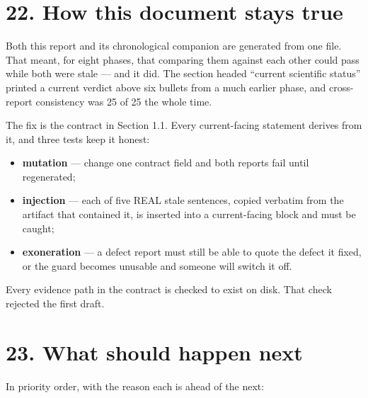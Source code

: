 \documentclass[10pt,]{article}
\providecommand{\tightlist}{%
  \setlength{\itemsep}{0pt}\setlength{\parskip}{0pt}}
\begin{document}
\newpage

\hypertarget{how-this-document-stays-true}{%
\section{22. How this document stays
true}\label{how-this-document-stays-true}}

Both this report and its chronological companion are generated from one
file. That meant, for eight phases, that comparing them against each
other could pass while both were stale --- and it did. The section
headed ``current scientific status'' printed a current verdict above six
bullets from a much earlier phase, and cross-report consistency was 25
of 25 the whole time.

The fix is the contract in Section 1.1. Every current-facing statement
derives from it, and three tests keep it honest:

\begin{itemize}
\tightlist
\item
  \textbf{mutation} --- change one contract field and both reports fail
  until regenerated;
\item
  \textbf{injection} --- each of five REAL stale sentences, copied
  verbatim from the artifact that contained it, is inserted into a
  current-facing block and must be caught;
\item
  \textbf{exoneration} --- a defect report must still be able to quote
  the defect it fixed, or the guard becomes unusable and someone will
  switch it off.
\end{itemize}

Every evidence path in the contract is checked to exist on disk. That
check rejected the first draft.

\newpage

\hypertarget{what-should-happen-next}{%
\section{23. What should happen next}\label{what-should-happen-next}}

In priority order, with the reason each is ahead of the next:
\end{document}

